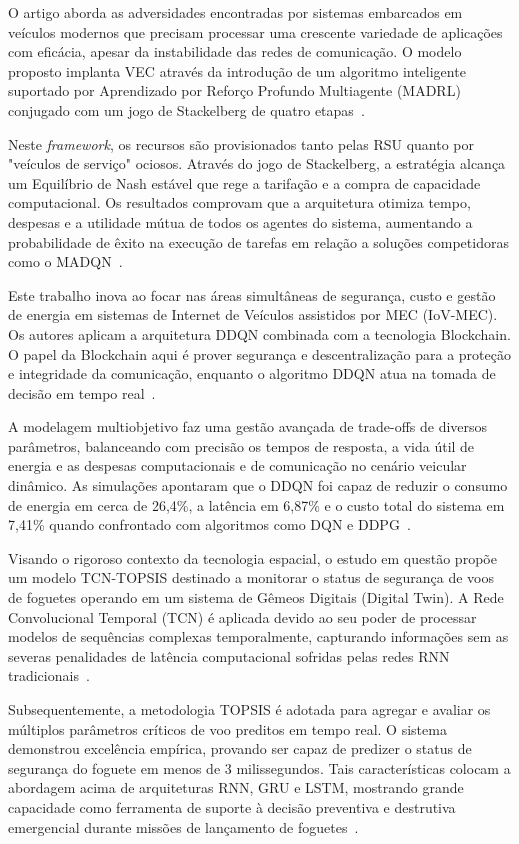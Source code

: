O artigo aborda as adversidades encontradas por sistemas embarcados em veículos modernos que precisam processar uma crescente variedade de aplicações com eficácia, apesar da instabilidade das redes de comunicação. O modelo proposto implanta \gls{VEC} através da introdução de um algoritmo inteligente suportado por Aprendizado por Reforço Profundo Multiagente (MADRL) conjugado com um jogo de Stackelberg de quatro etapas~\cite{fofana2024}.

Neste \textit{framework}, os recursos são provisionados tanto pelas \gls{RSU} quanto por "veículos de serviço" ociosos. Através do jogo de Stackelberg, a estratégia alcança um Equilíbrio de Nash estável que rege a tarifação e a compra de capacidade computacional. Os resultados comprovam que a arquitetura otimiza tempo, despesas e a utilidade mútua de todos os agentes do sistema, aumentando a probabilidade de êxito na execução de tarefas em relação a soluções competidoras como o MADQN~\cite{fofana2024}.

Este trabalho inova ao focar nas áreas simultâneas de segurança, custo e gestão de energia em sistemas de Internet de Veículos assistidos por \gls{MEC} (\gls{IoV}-\gls{MEC}). Os autores aplicam a arquitetura \gls{DDQN} combinada com a tecnologia Blockchain. O papel da Blockchain aqui é prover segurança e descentralização para a proteção e integridade da comunicação, enquanto o algoritmo \gls{DDQN} atua na tomada de decisão em tempo real~\cite{moghaddasi2024}.

A modelagem multiobjetivo faz uma gestão avançada de trade-offs de diversos parâmetros, balanceando com precisão os tempos de resposta, a vida útil de energia e as despesas computacionais e de comunicação no cenário veicular dinâmico. As simulações apontaram que o \gls{DDQN} foi capaz de reduzir o consumo de energia em cerca de 26,4\%, a latência em 6,87\% e o custo total do sistema em 7,41\% quando confrontado com algoritmos como \gls{DQN} e \gls{DDPG}~\cite{moghaddasi2024}.

Visando o rigoroso contexto da tecnologia espacial, o estudo em questão propõe um modelo TCN-\gls{TOPSIS} destinado a monitorar o status de segurança de voos de foguetes operando em um sistema de Gêmeos Digitais (Digital Twin). A Rede Convolucional Temporal (TCN) é aplicada devido ao seu poder de processar modelos de sequências complexas temporalmente, capturando informações sem as severas penalidades de latência computacional sofridas pelas redes \gls{RNN} tradicionais~\cite{li_fugang_2025}.

Subsequentemente, a metodologia \gls{TOPSIS} é adotada para agregar e avaliar os múltiplos parâmetros críticos de voo preditos em tempo real. O sistema demonstrou excelência empírica, provando ser capaz de predizer o status de segurança do foguete em menos de 3 milissegundos. Tais características colocam a abordagem acima de arquiteturas \gls{RNN}, GRU e \gls{LSTM}, mostrando grande capacidade como ferramenta de suporte à decisão preventiva e destrutiva emergencial durante missões de lançamento de foguetes~\cite{li_fugang_2025}.

